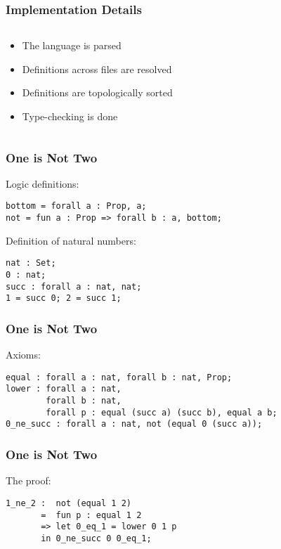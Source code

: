 \documentclass[aspectratio=169]{beamer}
\begin{document}
    	\begin{frame}
    		\frametitle{Implementation Details} 
			\begin{columns}[c]
    		\begin{column}{0.40 \textwidth}
           	\begin{itemize}
           		\item<2-> The language is parsed 
           		\item<3-> Definitions across files are resolved
           		\item<4-> Definitions are topologically sorted
           		\item<5-> Type-checking is done
           	\end{itemize}
           \end{column} 
       \begin{column}{0.60 \textwidth}
       	\centering
       		
       	\end{column}
       \end{columns}
 
    	\end{frame}    	
    	\begin{frame}[fragile]
    		\frametitle{One is Not Two}
    		Logic definitions: 
    			\begin{verbatim}
bottom = forall a : Prop, a; 
not = fun a : Prop => forall b : a, bottom;
    		\end{verbatim}
    	\pause
    		Definition of natural numbers: 
    \begin{verbatim}
nat : Set; 
0 : nat; 
succ : forall a : nat, nat; 
1 = succ 0; 2 = succ 1; 
    \end{verbatim}
\end{frame}

    	\begin{frame}[fragile]
    		\frametitle{One is Not Two}
    		Axioms: 
    			\begin{verbatim}
equal : forall a : nat, forall b : nat, Prop; 
lower : forall a : nat, 
        forall b : nat, 
        forall p : equal (succ a) (succ b), equal a b;
0_ne_succ : forall a : nat, not (equal 0 (succ a));  
    		\end{verbatim}
\end{frame}

    	\begin{frame}[fragile]
    		\frametitle{One is Not Two}
    		The proof: 
    			\begin{verbatim}
1_ne_2 :  not (equal 1 2)
       =  fun p : equal 1 2 
       => let 0_eq_1 = lower 0 1 p 
       in 0_ne_succ 0 0_eq_1; 
    		\end{verbatim}
\end{frame}
\end{document}
